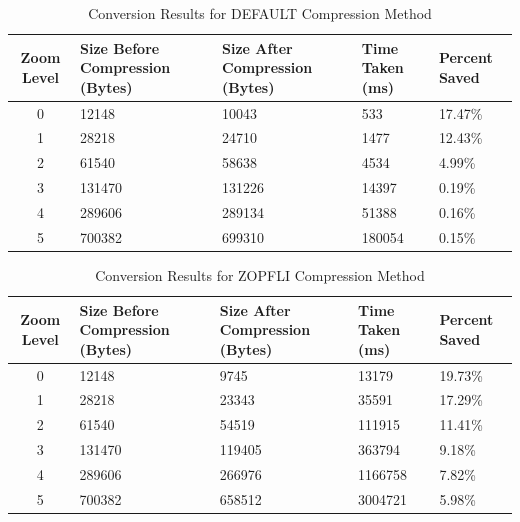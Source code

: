 \begin{table}[H]
    \centering
    \begin{tabularx}{\textwidth}{|c|X|X|X|X|}
        \hline
        \textbf{Zoom Level} & \textbf{Size Before Compression (Bytes)} & \textbf{Size After Compression (Bytes)} & \textbf{Time Taken (ms)} & \textbf{Percent Saved} \\ \hline
        0 & 12148 & 10043 & 533 & 17.47\% \\ \hline
        1 & 28218 & 24710 & 1477 & 12.43\% \\ \hline
        2 & 61540 & 58638 & 4534 & 4.99\% \\ \hline
        3 & 131470 & 131226 & 14397 & 0.19\% \\ \hline
        4 & 289606 & 289134 & 51388 & 0.16\% \\ \hline
        5 & 700382 & 699310 & 180054 & 0.15\% \\ \hline
    \end{tabularx}
    \caption{Conversion Results for DEFAULT Compression Method}
    \label{tab:compression_default}
\end{table}

\begin{table}[H]
    \centering
    \begin{tabularx}{\textwidth}{|c|X|X|X|X|}
        \hline
        \textbf{Zoom Level} & \textbf{Size Before Compression (Bytes)} & \textbf{Size After Compression (Bytes)} & \textbf{Time Taken (ms)} & \textbf{Percent Saved} \\ \hline
        0 & 12148 & 9745 & 13179 & 19.73\% \\ \hline
        1 & 28218 & 23343 & 35591 & 17.29\% \\ \hline
        2 & 61540 & 54519 & 111915 & 11.41\% \\ \hline
        3 & 131470 & 119405 & 363794 & 9.18\% \\ \hline
        4 & 289606 & 266976 & 1166758 & 7.82\% \\ \hline
        5 & 700382 & 658512 & 3004721 & 5.98\% \\ \hline
    \end{tabularx}
    \caption{Conversion Results for ZOPFLI Compression Method}
    \label{tab:compression_zopfli}
\end{table}

